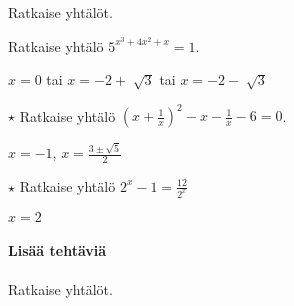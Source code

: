 \begin{tehtavasivu}
\begin{tehtava}
    Ratkaise yhtälöt.
    \begin{alakohdat}
    \end{alakohdat}
    \begin{vastaus}
        \begin{alakohdat}
        \end{alakohdat}
    \end{vastaus}
\end{tehtava}

\begin{tehtava}
 	Ratkaise yhtälö $5^{x^3+4x^2+x}=1$. 
	\begin{vastaus}
	$x=0$ tai $x=-2 + \sqrt[]{3}$ tai $x=-2 - \sqrt[]{3}$
	\end{vastaus}
\end{tehtava}

\begin{tehtava}
	$ \star $ Ratkaise yhtälö $(x+\frac{1}{x})^2-x-\frac{1}{x}-6 = 0$.
	\begin{vastaus}
		$x = -1$, $x = \frac{3\pm \sqrt{5}}{2}$
	\end{vastaus}
\end{tehtava}

\begin{tehtava}
	$ \star $ Ratkaise yhtälö $2^x-1=\frac{12}{2^x}$
	\begin{vastaus}
	$x=2$
	\end{vastaus}
\end{tehtava}

\paragraph*{Lisää tehtäviä}

\begin{tehtava}
    Ratkaise yhtälöt.
    \begin{alakohdat}
    \end{alakohdat}
    \begin{vastaus}
        \begin{alakohdat}
        \end{alakohdat}
    \end{vastaus}
\end{tehtava}


\end{tehtavasivu}
